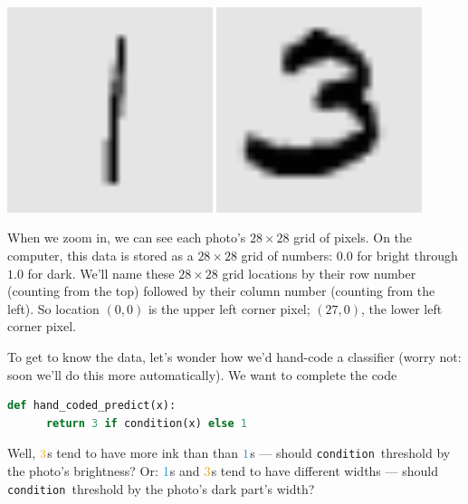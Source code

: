   \begin{marginfigure}[2.5cm]
    \center
    \includegraphics[width=0.45\textwidth]{example-mnist/mnist-trn-01}%
    \hspace{0.5cm}%
    \includegraphics[width=0.45\textwidth]{example-mnist/mnist-trn-00}%
  \end{marginfigure}
  When we zoom in, we can see each photo's $28\times 28$ grid of pixels.
  On the computer, this data is stored as a $28\times 28$ grid of
  numbers: $0.0$ for bright through $1.0$ for dark.  We'll name these
  $28\times28$ grid locations by their row number (counting from
  the top) followed by their column number (counting from the
  left).  So location $(0,0)$ is the upper left corner pixel;
  $(27,0)$, the lower left corner pixel.
  \par\noindent

  To get to know the data, let's wonder how we'd hand-code a
  classifier (worry not: soon we'll do this more automatically).
  We want to complete the code
  \begin{lstlisting}[language=Python, basicstyle=\footnotesize\ttfamily]
    def hand_coded_predict(x):
      return 3 if condition(x) else 1
  \end{lstlisting}
  Well, ${\rng{3}}$s tend to have more ink than than ${\blu{1}}$s ---
  should \texttt{condition}\ threshold by the photo's brightness?
  Or: ${\blu{1}}$s and ${\rng{3}}$s tend to have different widths ---
  should \texttt{condition}\ threshold by the photo's dark part's width?

